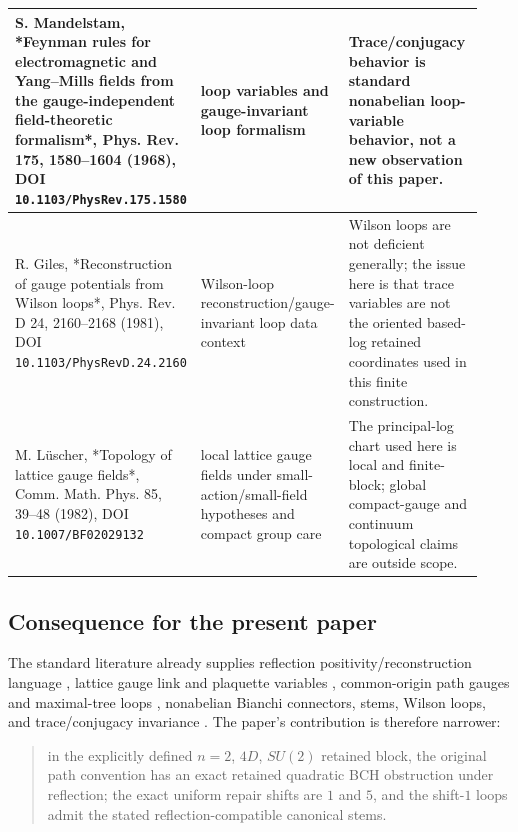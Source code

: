 \documentclass[10pt]{article}
\begin{document}
\begin{center}
\begin{longtable}{|p{0.31\linewidth}|p{0.31\linewidth}|p{0.31\linewidth}|}
\hline
S. Mandelstam, *Feynman rules for electromagnetic and Yang--Mills fields from the gauge-independent field-theoretic formalism*, Phys. Rev. 175, 1580--1604 (1968), DOI \texttt{10.1103/PhysRev.175.1580} & loop variables and gauge-invariant loop formalism & Trace/conjugacy behavior is standard nonabelian loop-variable behavior, not a new observation of this paper. \\
\hline
R. Giles, *Reconstruction of gauge potentials from Wilson loops*, Phys. Rev. D 24, 2160--2168 (1981), DOI \texttt{10.1103/PhysRevD.24.2160} & Wilson-loop reconstruction/gauge-invariant loop data context & Wilson loops are not deficient generally; the issue here is that trace variables are not the oriented based-log retained coordinates used in this finite construction. \\
\hline
M. Lüscher, *Topology of lattice gauge fields*, Comm. Math. Phys. 85, 39--48 (1982), DOI \texttt{10.1007/BF02029132} & local lattice gauge fields under small-action/small-field hypotheses and compact group care & The principal-log chart used here is local and finite-block; global compact-gauge and continuum topological claims are outside scope. \\
\hline
\end{longtable}
\end{center}

\subsection{Consequence for the present paper}

The standard literature already supplies reflection positivity/reconstruction language \cite{OsterwalderSchrader1973,OsterwalderSchrader1975,OsterwalderSeiler1978}, lattice gauge link and plaquette variables \cite{Wilson1974,KogutSusskind1975}, common-origin path gauges and maximal-tree loops \cite{Batrouni1982,BurbanoBauer2024}, nonabelian Bianchi connectors, stems, Wilson loops, and trace/conjugacy invariance \cite{Mandelstam1968,Giles1981}.  The paper's contribution is therefore narrower:

\begin{quote}
in the explicitly defined \(n=2\), \(4D\), \(SU(2)\) retained block, the original path convention has an exact retained quadratic BCH obstruction under reflection; the exact uniform repair shifts are \(1\) and \(5\), and the shift-\(1\) loops admit the stated reflection-compatible canonical stems.
\end{quote}
\end{document}
